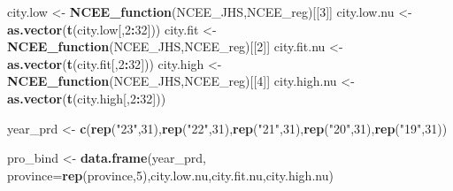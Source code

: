 \documentclass[]{article}
\newenvironment{Shaded}{\begin{snugshade}}{\end{snugshade}}
\newcommand{\KeywordTok}[1]{\textcolor[rgb]{0.13,0.29,0.53}{\textbf{#1}}}
\newcommand{\DataTypeTok}[1]{\textcolor[rgb]{0.13,0.29,0.53}{#1}}
\newcommand{\DecValTok}[1]{\textcolor[rgb]{0.00,0.00,0.81}{#1}}
\newcommand{\StringTok}[1]{\textcolor[rgb]{0.31,0.60,0.02}{#1}}
\newcommand{\OperatorTok}[1]{\textcolor[rgb]{0.81,0.36,0.00}{\textbf{#1}}}
\newcommand{\NormalTok}[1]{#1}
\begin{document}
\begin{Shaded}
\begin{Highlighting}[]
\NormalTok{city.low <-}\StringTok{ }\KeywordTok{NCEE_function}\NormalTok{(NCEE_JHS,NCEE_reg)[[}\DecValTok{3}\NormalTok{]]}
\NormalTok{city.low.nu <-}\StringTok{ }\KeywordTok{as.vector}\NormalTok{(}\KeywordTok{t}\NormalTok{(city.low[,}\DecValTok{2}\OperatorTok{:}\DecValTok{32}\NormalTok{]))}
\NormalTok{city.fit <-}\StringTok{ }\KeywordTok{NCEE_function}\NormalTok{(NCEE_JHS,NCEE_reg)[[}\DecValTok{2}\NormalTok{]]}
\NormalTok{city.fit.nu <-}\StringTok{ }\KeywordTok{as.vector}\NormalTok{(}\KeywordTok{t}\NormalTok{(city.fit[,}\DecValTok{2}\OperatorTok{:}\DecValTok{32}\NormalTok{]))}
\NormalTok{city.high <-}\StringTok{ }\KeywordTok{NCEE_function}\NormalTok{(NCEE_JHS,NCEE_reg)[[}\DecValTok{4}\NormalTok{]]}
\NormalTok{city.high.nu <-}\StringTok{ }\KeywordTok{as.vector}\NormalTok{(}\KeywordTok{t}\NormalTok{(city.high[,}\DecValTok{2}\OperatorTok{:}\DecValTok{32}\NormalTok{]))}

\NormalTok{year_prd <-}\StringTok{ }\KeywordTok{c}\NormalTok{(}\KeywordTok{rep}\NormalTok{(}\StringTok{"23"}\NormalTok{,}\DecValTok{31}\NormalTok{),}\KeywordTok{rep}\NormalTok{(}\StringTok{"22"}\NormalTok{,}\DecValTok{31}\NormalTok{),}\KeywordTok{rep}\NormalTok{(}\StringTok{"21"}\NormalTok{,}\DecValTok{31}\NormalTok{),}\KeywordTok{rep}\NormalTok{(}\StringTok{"20"}\NormalTok{,}\DecValTok{31}\NormalTok{),}\KeywordTok{rep}\NormalTok{(}\StringTok{"19"}\NormalTok{,}\DecValTok{31}\NormalTok{))}

\NormalTok{pro_bind <-}\StringTok{ }\KeywordTok{data.frame}\NormalTok{(year_prd, }\DataTypeTok{province=}\KeywordTok{rep}\NormalTok{(province,}\DecValTok{5}\NormalTok{),city.low.nu,city.fit.nu,city.high.nu)}


\end{Highlighting}
\end{Shaded}
\end{document}
